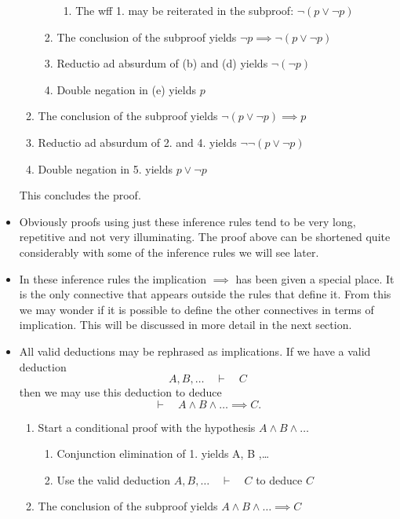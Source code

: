 \begin{itemize}
\begin{example}
\begin{enumerate}
\begin{enumerate}
\begin{enumerate}
\item The wff 1. may be reiterated in the subproof: $\neg(p\lor \neg p)$
\end{enumerate}
\item The conclusion of the subproof yields $\neg p \implies \neg(p \lor \neg p)$
\item Reductio ad absurdum of (b) and (d) yields $\neg (\neg p)$
\item Double negation in (e) yields $p$
\end{enumerate}
\item The conclusion of the subproof yields $\neg(p\lor \neg p) \implies p$
\item Reductio ad absurdum of 2. and 4. yields $\neg\neg(p\lor \neg p)$
\item Double negation in 5. yields $p\lor \neg p$
\end{enumerate}
This concludes the proof.
\end{example}
\item Obviously proofs using just these inference rules tend to be very long, repetitive and not very illuminating. The proof above can be shortened quite considerably with some of the inference rules we will see later.
\item In these inference rules the implication $\implies$ has been given a special place. It is the only connective that appears outside the rules that define it. From this we may wonder if it is possible to define the other connectives in terms of implication. This will be discussed in more detail in the next section.
\item All valid deductions may be rephrased as implications. If we have a valid deduction
\[ A, B ,\ldots \quad\vdash\quad C \]
then we may use this deduction to deduce
\[ \vdash\quad A \land B \land\ldots \implies C. \]
\begin{note}
\begin{enumerate}
\item Start a conditional proof with the hypothesis $A \land B \land\ldots$
\begin{enumerate}
\item Conjunction elimination of 1. yields A, B ,\ldots
\item Use the valid deduction $A, B ,\ldots \quad\vdash\quad C$ to deduce $C$
\end{enumerate}
\item The conclusion of the subproof yields $A \land B \land\ldots \implies C$

\end{enumerate}
\end{note}
\end{itemize}
